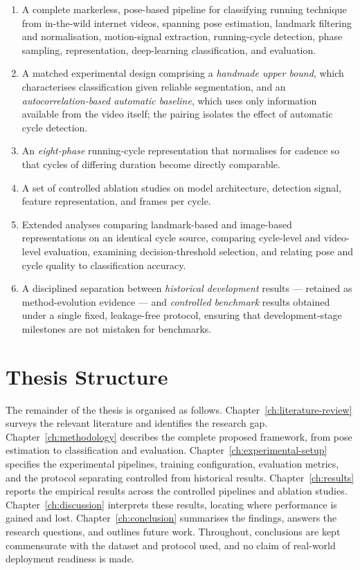 \begin{enumerate}
  \item A complete markerless, pose-based pipeline for classifying running
        technique from in-the-wild internet videos, spanning pose estimation,
        landmark filtering and normalisation, motion-signal extraction,
        running-cycle detection, phase sampling, representation, deep-learning
        classification, and evaluation.
  \item A matched experimental design comprising a \emph{handmade upper bound},
        which characterises classification given reliable segmentation, and an
        \emph{autocorrelation-based automatic baseline}, which uses only
        information available from the video itself; the pairing isolates the
        effect of automatic cycle detection.
  \item An \emph{eight-phase} running-cycle representation that normalises for
        cadence so that cycles of differing duration become directly comparable.
  \item A set of controlled ablation studies on model architecture, detection
        signal, feature representation, and frames per cycle.
  \item Extended analyses comparing landmark-based and image-based
        representations on an identical cycle source, comparing cycle-level and
        video-level evaluation, examining decision-threshold selection, and
        relating pose and cycle quality to classification accuracy.
  \item A disciplined separation between \emph{historical development} results
        --- retained as method-evolution evidence --- and \emph{controlled
        benchmark} results obtained under a single fixed, leakage-free protocol,
        ensuring that development-stage milestones are not mistaken for
        benchmarks.
\end{enumerate}

\section{Thesis Structure}
\label{sec:intro-structure}

The remainder of the thesis is organised as follows.
Chapter~\ref{ch:literature-review} surveys the relevant literature and identifies the research gap.
Chapter~\ref{ch:methodology} describes the complete proposed framework, from pose estimation to classification and evaluation.
Chapter~\ref{ch:experimental-setup} specifies the experimental pipelines, training configuration, evaluation metrics, and the protocol separating controlled from historical results.
Chapter~\ref{ch:results} reports the empirical results across the controlled pipelines and ablation studies.
Chapter~\ref{ch:discussion} interprets these results, locating where performance is gained and lost.
Chapter~\ref{ch:conclusion} summarises the findings, answers the research questions, and outlines future work.
Throughout, conclusions are kept commensurate with the dataset and protocol used, and no claim of real-world deployment readiness is made.

